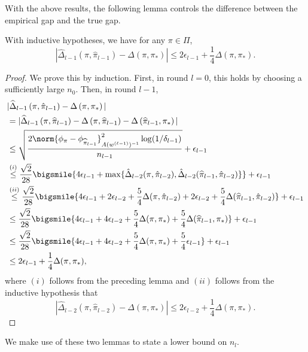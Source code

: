 \documentclass{article}
\newcommand{\kevin}[1]{\textcolor{red}{KGJ:#1}}
\newcommand{\pill}{\widehat{\pi}_{l-1}}
\newcommand{\1}{\mathbf{1}}
\begin{document}
With the above results, the following lemma controls the difference between the empirical gap and the true gap. 
\begin{lemma}\label{lem:diff_emp_true_gap}
With inductive hypotheses, we have for any $\pi\in\Pi$,
$$
|\widehat{\Delta}_{l-1}\left(\pi, \pill\right)-\Delta\left(\pi, \pi_*\right)| \leq 2 \epsilon_{l-1}+ \frac{1}{4}\Delta(\pi,\pi_*).
$$
\end{lemma}
\begin{proof}
We prove this by induction. First, in round $l=0$, this holds by choosing a sufficiently large $n_0$. Then, in round $l-1$,  
\begin{align*}
    &|\widehat{\Delta}_{l-1}\left(\pi, \hat{\pi}_{l-1}\right)-\Delta\left(\pi, \pi_*\right)|\\
    &= |\widehat{\Delta}_{l-1}\left(\pi, \pill\right)-\Delta\left(\pi, \pill\right)-\Delta\left(\pill, \pi_*\right)|\\
    &\leq \sqrt{\frac{2\norm{\phi_{\pi}-\phi_{\pill}}_{A(w^{(\ell-1)})^{-1}}^2\log(1/\delta_{l-1})}{n_{l-1}}}+ \epsilon_{l-1}\\
    &\overset{(i)}{\leq} \frac{\sqrt{2}}{28}\bigsmile{4\epsilon_{l-1}+\max\{\hat{\Delta}_{l-2}(\pi,\hat{\pi}_{l-2}),\hat{\Delta}_{l-2}(\pill,\hat{\pi}_{l-2})\}}+\epsilon_{l-1}\\
    &\overset{(ii)}{\leq} \frac{\sqrt{2}}{28}\bigsmile{4\epsilon_{l-1}+2\epsilon_{l-2}+\frac{5}{4}\Delta(\pi,\hat{\pi}_{l-2})+2\epsilon_{l-2}+\frac{5}{4}\Delta(\pill,\hat{\pi}_{l-2})}+\epsilon_{l-1}\\
    &\leq \frac{\sqrt{2}}{28}\bigsmile{4\epsilon_{l-1}+4\epsilon_{l-2}+\frac{5}{4}\Delta(\pi,\pi_*)+\frac{5}{4}\Delta(\pill,\pi_*)}+\epsilon_{l-1}\\
    &\leq \frac{\sqrt{2}}{28}\bigsmile{4\epsilon_{l-1}+4\epsilon_{l-2}+\frac{5}{4}\Delta(\pi,\pi_*)+\frac{5}{4}\epsilon_{l-1}}+\epsilon_{l-1}\\
    &\leq 2\epsilon_{l-1}+\frac{1}{4}\Delta(\pi,\pi_*),
\end{align*}
where $(i)$ follows from the preceding lemma and $(ii)$ follows from the inductive hypothesis that 
\[|\hat{\Delta}_{l-2}(\pi,\hat{\pi}_{l-2})-\Delta(\pi,\pi_*)|\leq 2 \epsilon_{l-2}+ \frac{1}{4}\Delta(\pi,\pi_*).\]
\end{proof}

We make use of these two lemmas to state a lower bound on $n_l$. 
\end{document}
